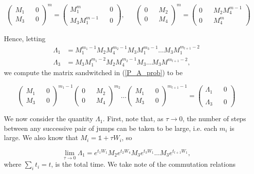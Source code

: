 \documentclass{article}
\begin{document}
\begin{align}
  \begin{pmatrix} M_1 && 0 \\ M_3 && 0 \end{pmatrix}^{m} =   \begin{pmatrix} M_1^m && 0 \\ M_3M_1^{m-1} && 0 \end{pmatrix} ,&& \begin{pmatrix} 0 && M_2 \\ 0 && M_4 \end{pmatrix}^m = \begin{pmatrix} 0 && M_2M_4^{m-1} \\ 0 && M_4^m \end{pmatrix}
\end{align}

Hence, letting
\begin{align}
  \Lambda_1 &= M_1^{m_1-1}M_2M_4^{m_2-1}M_3M_1^{m_3-1}\ldots M_3M_1^{m_{l+1}-2} \\
  \Lambda_3 &= M_3M_1^{m_1-2}M_2M_4^{m_2-1}M_3\ldots M_3M^{m_{l+1}-2},
\end{align}
we compute the matrix sandwitched in (\ref{P_A_prob}) to be

\begin{equation}
  \begin{pmatrix} M_1 && 0 \\ M_3 && 0 \end{pmatrix}^{m_1-1}\begin{pmatrix} 0 && M_2 \\ 0 && M_4 \end{pmatrix}^{m_2}\ldots\begin{pmatrix} M_1 && 0 \\ M_3 && 0 \end{pmatrix}^{m_{l+1}-1} = \begin{pmatrix}\Lambda_1 && 0 \\
  \\
  \Lambda_3 && 0
\end{pmatrix} \label{sandwitch_1_1}
\end{equation}

We now consider the quantity $\Lambda_1$. First, note that, as $\tau \rightarrow 0$, the number of steps between any successive pair of jumps can be taken to be large, i.e. each $m_i$ is large. We also know that $M_i = \mathbb{1} + \tau W_i$, so

\begin{equation}\label{limit_lambda_1}
  \lim_{\tau \rightarrow 0}\Lambda_1 = e^{t_1W_1}M_2e^{t_2W_4}M_3e^{t_3W_1}\ldots M_3e^{t_{l+1}W_1},
\end{equation}
where $\sum_i t_i = t$, is the total time. We take note of the commutation relations
\end{document}
